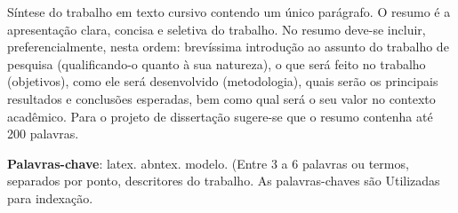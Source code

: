 %
%

\begin{resumo}

Síntese do trabalho em texto cursivo contendo um único parágrafo. O resumo é a apresentação clara, concisa e seletiva do trabalho.
No resumo deve-se incluir, preferencialmente, nesta ordem: brevíssima introdução ao assunto do trabalho de pesquisa (qualificando-o quanto à sua natureza), o que será feito no trabalho (objetivos), como ele será desenvolvido (metodologia), quais serão os principais resultados e conclusões esperadas, bem como qual será o seu valor no contexto acadêmico. Para o projeto de dissertação sugere-se que o resumo contenha até 200 palavras.

\textbf{Palavras-chave}: latex. abntex. modelo.
(Entre 3 a 6 palavras ou termos, separados por ponto, descritores do trabalho. As palavras-chaves são Utilizadas para indexação.

\end{resumo}
